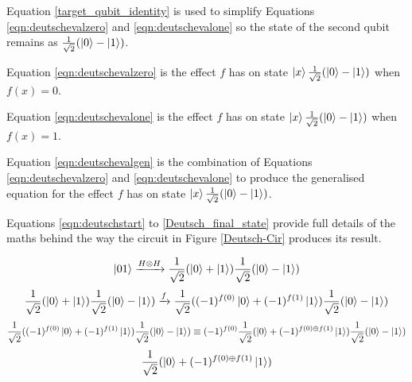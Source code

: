 \begin{list}{}{\topsep=0cm,\itemsep=0cm}
  \item Equation \ref{target_qubit_identity} is used to simplify Equations \ref{eqn:deutschevalzero} and \ref{eqn:deutschevalone} so the state of the second qubit remains as $\frac{1}{\sqrt{2}}(\left\vert{0}\right\rangle-\left\vert{1}\right\rangle)$.
  \item Equation \ref{eqn:deutschevalzero} is the effect $f$ has on state $\left\vert{x}\right\rangle\frac{1}{\sqrt{2}}(\left\vert{0}\right\rangle-\left\vert{1}\right\rangle)$ when $f(x)=0$.
  \item Equation \ref{eqn:deutschevalone} is the effect $f$ has on state $\left\vert{x}\right\rangle\frac{1}{\sqrt{2}}(\left\vert{0}\right\rangle-\left\vert{1}\right\rangle)$ when $f(x)=1$.
  \item Equation \ref{eqn:deutschevalgen} is the combination of Equations \ref{eqn:deutschevalzero} and \ref{eqn:deutschevalone} to produce the generalised equation for the effect $f$ has on state $\left\vert{x}\right\rangle\frac{1}{\sqrt{2}}(\left\vert{0}\right\rangle-\left\vert{1}\right\rangle)$.
\end{list}

Equations \ref{eqn:deutschstart} to \ref{Deutsch_final_state} provide full details of the maths behind the way the circuit in Figure \ref{Deutsch-Cir} produces its result.

\begin{equation}
\label{eqn:deutschstart}
\left\vert{01}\right\rangle \xrightarrow{H\otimes{H}} \frac{1}{\sqrt{2}}(\left\vert{0}\right\rangle+\left\vert{1}\right\rangle)\frac{1}{\sqrt{2}}(\left\vert{0}\right\rangle-\left\vert{1}\right\rangle)
\end{equation}
\begin{equation}
\label{eqn:deutschevalsuper1}
 \frac{1}{\sqrt{2}}(\left\vert{0}\right\rangle+\left\vert{1}\right\rangle)\frac{1}{\sqrt{2}}(\left\vert{0}\right\rangle-\left\vert{1}\right\rangle) \xrightarrow{f} \frac{1}{\sqrt{2}}((-1)^{f(0)}\left\vert{0}\right\rangle+(-1)^{f(1)}\left\vert{1}\right\rangle)\frac{1}{\sqrt{2}}(\left\vert{0}\right\rangle-\left\vert{1}\right\rangle)
\end{equation}
\begin{equation}
\label{eqn:deutschevalsuper2}
 \frac{1}{\sqrt{2}}((-1)^{f(0)}\left\vert{0}\right\rangle+(-1)^{f(1)}\left\vert{1}\right\rangle)\frac{1}{\sqrt{2}}(\left\vert{0}\right\rangle-\left\vert{1}\right\rangle) \equiv (-1)^{f(0)}\frac{1}{\sqrt{2}}(\left\vert{0}\right\rangle+(-1)^{f(0)\oplus{f(1)}}\left\vert{1}\right\rangle)\frac{1}{\sqrt{2}}(\left\vert{0}\right\rangle-\left\vert{1}\right\rangle)
\end{equation}
\begin{equation}
 \frac{1}{\sqrt{2}}(\left\vert{0}\right\rangle+(-1)^{f(0)\oplus{f(1)}}\left\vert{1}\right\rangle)
\label{Deutsch_final_state}
\end{equation}

